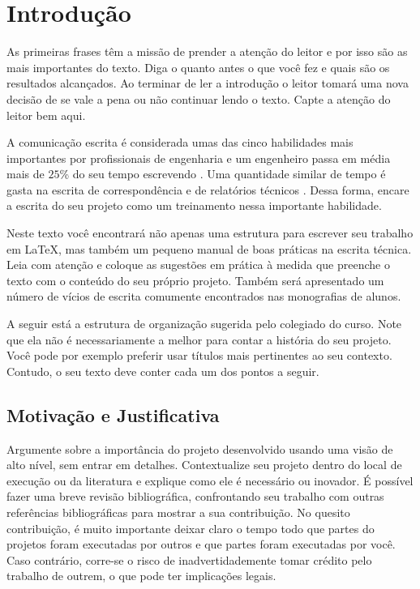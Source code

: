 \chapter{Introdução}
\label{chap:intro} %

As primeiras frases têm a missão de prender a atenção do leitor e por isso são as mais importantes do texto. Diga o quanto antes o que você fez e quais são os resultados alcançados. Ao terminar de ler a introdução o leitor tomará uma nova decisão de se vale a pena ou não continuar lendo o texto. Capte a atenção do leitor bem aqui.

A comunicação escrita é considerada umas das cinco habilidades mais importantes por profissionais de engenharia e um engenheiro passa em média mais de $25$\% do seu tempo escrevendo \cite{eggert2002response,spretnak1982survey}. Uma quantidade similar de tempo é gasta na escrita de correspondência e de relatórios técnicos \cite{cunningham2012perceptions}. Dessa forma, encare a escrita do seu projeto como um treinamento nessa importante habilidade.

Neste texto você encontrará não apenas uma estrutura para escrever seu trabalho em \LaTeX, mas também um pequeno manual de boas práticas na escrita técnica. Leia com atenção e coloque as sugestões em prática à medida que preenche o texto com o conteúdo do seu próprio projeto. Também será apresentado um número de vícios de escrita comumente encontrados nas monografias de alunos. 

A seguir está a estrutura de organização sugerida pelo colegiado do curso. Note que ela não é necessariamente a melhor para contar a história do seu projeto. Você pode por exemplo preferir usar títulos mais pertinentes ao seu contexto. Contudo, o seu texto deve conter cada um dos pontos a seguir.

\section{Motivação e Justificativa}
\label{sec:motivacao}

Argumente sobre a importância do projeto desenvolvido usando uma visão de alto nível, sem entrar em detalhes. Contextualize seu projeto dentro do local de execução ou da literatura e explique como ele é necessário ou inovador. É possível fazer uma breve revisão bibliográfica, confrontando seu trabalho com outras referências bibliográficas para mostrar a sua contribuição. No quesito contribuição, é muito importante deixar claro o tempo todo que partes do projetos foram executadas por outros e que partes foram executadas por você. Caso contrário, corre-se o risco de inadvertidademente tomar crédito pelo trabalho de outrem, o que pode ter implicações legais. 


